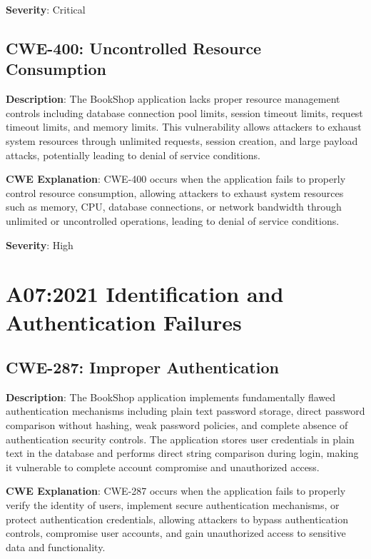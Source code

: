 \documentclass[]{UCD_CS_FYP_Report}
\begin{document}
\textbf{Severity}: Critical



\section{CWE-400: Uncontrolled Resource Consumption}

\textbf{Description}: The BookShop application lacks proper resource management controls including database connection pool limits, session timeout limits, request timeout limits, and memory limits. This vulnerability allows attackers to exhaust system resources through unlimited requests, session creation, and large payload attacks, potentially leading to denial of service conditions.

\textbf{CWE Explanation}: CWE-400 occurs when the application fails to properly control resource consumption, allowing attackers to exhaust system resources such as memory, CPU, database connections, or network bandwidth through unlimited or uncontrolled operations, leading to denial of service conditions.

\textbf{Severity}: High



\chapter{A07:2021 Identification and Authentication Failures}

\section{CWE-287: Improper Authentication}

\textbf{Description}: The BookShop application implements fundamentally flawed authentication mechanisms including plain text password storage, direct password comparison without hashing, weak password policies, and complete absence of authentication security controls. The application stores user credentials in plain text in the database and performs direct string comparison during login, making it vulnerable to complete account compromise and unauthorized access.

\textbf{CWE Explanation}: CWE-287 occurs when the application fails to properly verify the identity of users, implement secure authentication mechanisms, or protect authentication credentials, allowing attackers to bypass authentication controls, compromise user accounts, and gain unauthorized access to sensitive data and functionality.
\end{document}
